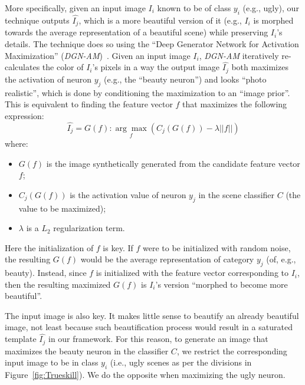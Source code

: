 More specifically, given an input image $I_i$ known to be of class $y_i$  (e.g., ugly), our technique outputs  $\hat{I_j}$, which is a more beautiful version of it (e.g., $I_i$ is morphed  towards the average representation of a beautiful scene) while preserving $I_i$'s details. The technique does so using the ``Deep Generator Network for Activation Maximization'' (\emph{DGN-AM})~\cite{nguyen2016synthesizing}. Given an input image $I_i$, \emph{DGN-AM} iteratively re-calculates the color of $I_i$'s pixels in  a way  the output image $\hat{I_j}$  both maximizes  the  activation of neuron $y_j$ (e.g., the ``beauty neuron'') and looks ``photo realistic'',  which is done by conditioning the maximization to an ``image prior''. This is equivalent to finding the feature vector $f$ that maximizes the following expression:
\begin{equation}
\hat{I_j} =G( f ) : \underset{f}{\arg\max}(C_{j}(G(f))-\lambda||f||)
\end{equation}
where:
\begin{itemize}
\item $G(f)$ is the image synthetically generated from the candidate feature vector $f$;
\item $C_j(G(f))$ is the activation value of neuron $y_j$ in the scene classifier $C$ (the value to be maximized);
\item $\lambda$ is a $L_2$ regularization term.
\end{itemize}
Here the initialization of $f$ is key. If $f$ were to be initialized with random noise, the resulting $G(f)$ would be the average representation of category $y_j$ (of, e.g., beauty). Instead, since $f$ is initialized with the feature vector corresponding to $I_i$, then the resulting maximized $G(f)$ is $I_i$'s version ``morphed to become more beautiful''.

The input image is also key. It makes little sense to beautify an already beautiful image, not least because such beautification process would result in a saturated template $\hat{I_j}$ in our framework. For this reason, to generate an image that maximizes the beauty neuron in the classifier $C$, we restrict the  corresponding input image to be in class $y_i$ (i.e., ugly scenes as per the divisions in Figure~\ref{fig:Trueskill}). We do the opposite when maximizing the ugly neuron. 




